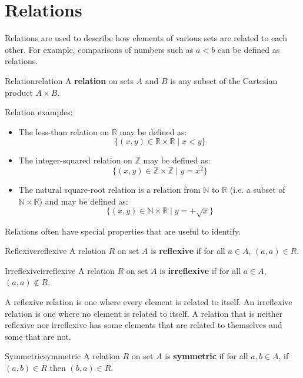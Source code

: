 \section{Relations}
Relations are used to describe how elements of various sets
are related to each other. For example, comparisons of numbers such as
\( a < b \) can be defined as relations.

\begin{definition}{Relation}{relation}
  A \textbf{relation} on sets \( A \) and \( B \) is any subset of the
  Cartesian product \( A \times B \).
\end{definition}

Relation examples:
\begin{itemize}
  \item The less-than relation on \( \mathbb{R} \) may be defined as:
    \[
      \{ (x, y) \in \mathbb{R} \times \mathbb{R} \mid x < y \}
    \]
  \item The integer-squared relation on \( \mathbb{Z} \) may be defined as:
    \[
      \{ (x, y) \in \mathbb{Z} \times \mathbb{Z} \mid y = x^2 \}
    \]
  \item The natural square-root relation is a relation from \( \mathbb{N} \) to \( \mathbb{R} \)
  (i.e. a subset of \( \mathbb{N} \times \mathbb{R} \)) and may be defined as:
    \[
      \{ (x, y) \in \mathbb{N} \times \mathbb{R} \mid y = +\sqrt{x} \}
    \]
\end{itemize}

Relations often have special properties that are useful to identify.

\begin{definition}{Reflexive}{reflexive}
  A relation \( R \) on set \( A \) is \textbf{reflexive} if for all \( a \in A \), \( (a, a) \in R \).
\end{definition}

\begin{definition}{Irreflexive}{irreflexive}
  A relation \( R \) on set \( A \) is \textbf{irreflexive} if for all \( a \in A \), \( (a, a) \notin R \).
\end{definition}

A reflexive relation is one where every element is related to itself. An irreflexive relation is one where
no element is related to itself. A relation that is neither reflexive nor irreflexive has some elements
that are related to themselves and some that are not.

\begin{definition}{Symmetric}{symmetric}
  A relation \( R \) on set \( A \) is \textbf{symmetric} if for all \( a, b \in A \), if \( (a, b) \in R \) then
  \( (b, a) \in R \).
\end{definition}

